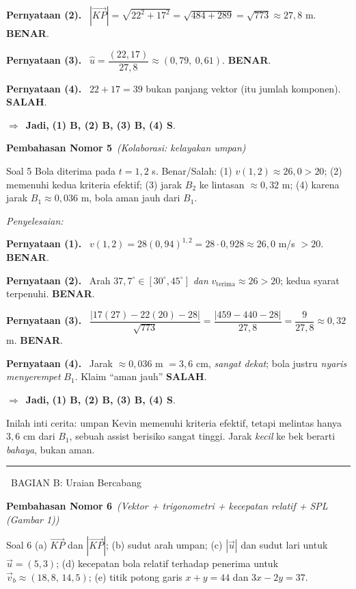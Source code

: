 \documentclass[11pt,a4paper]{article}
\newcommand{\jawab}{\par\smallskip\noindent\textit{\textcolor{oranye}{Penyelesaian:}}\par\smallskip}
\newcommand{\jadi}{\par\smallskip\noindent$\Rightarrow$\ \textbf{Jadi, }}
\newcommand{\benar}{\textbf{\textcolor{hijau}{BENAR}}}
\newcommand{\salah}{\textbf{\textcolor{merah}{SALAH}}}
\newcommand{\pernyataan}[1]{\par\smallskip\noindent\textbf{Pernyataan (#1).}\ }
\newcommand{\bagianjudul}[1]{\par\bigskip\noindent%
  {\large\bfseries\color{ungu}\rule[-2pt]{4pt}{16pt}\ #1}\par\smallskip}
\newcommand{\nomorjudul}[2]{\par\bigskip\noindent%
  {\large\bfseries\color{ungu}Pembahasan Nomor #1}\ {\normalfont\itshape\color{gray}(#2)}\par\nopagebreak\smallskip}
\begin{document}
\pernyataan{2} $|\vec{KP}|=\sqrt{22^2+17^2}=\sqrt{484+289}=\sqrt{773}\approx27{,}8$ m. \benar.

\pernyataan{3} $\hat{u}=\dfrac{(22,17)}{27{,}8}\approx(0{,}79,\ 0{,}61)$. \benar.

\pernyataan{4} $22+17=39$ bukan panjang vektor (itu jumlah komponen). \salah.

\jadi \textbf{(1) B, (2) B, (3) B, (4) S}.

\nomorjudul{5}{Kolaborasi: kelayakan umpan}
\begin{soalbox}{Soal 5}
Bola diterima pada $t=1{,}2$ s. Benar/Salah: (1) $v(1{,}2)\approx26{,}0>20$;
(2) memenuhi kedua kriteria efektif; (3) jarak $B_2$ ke lintasan $\approx0{,}32$ m;
(4) karena jarak $B_1\approx0{,}036$ m, bola aman jauh dari $B_1$.
\end{soalbox}

\jawab
\pernyataan{1} $v(1{,}2)=28(0{,}94)^{1{,}2}=28\cdot0{,}928\approx26{,}0$ m/s $>20$. \benar.

\pernyataan{2} Arah $37{,}7^\circ\in[30^\circ,45^\circ]$ \emph{dan} $v_{\text{terima}}\approx26>20$;
kedua syarat terpenuhi. \benar.

\pernyataan{3} $\dfrac{|17(27)-22(20)-28|}{\sqrt{773}}=\dfrac{|459-440-28|}{27{,}8}=\dfrac{9}{27{,}8}\approx0{,}32$ m. \benar.

\pernyataan{4} Jarak $\approx0{,}036$ m $=3{,}6$ cm, \emph{sangat dekat}; bola justru
\emph{nyaris menyerempet} $B_1$. Klaim ``aman jauh'' \salah.

\jadi \textbf{(1) B, (2) B, (3) B, (4) S}.

\begin{tips}
Inilah inti cerita: umpan Kevin memenuhi kriteria efektif, tetapi melintas hanya
$3{,}6$ cm dari $B_1$, sebuah assist berisiko sangat tinggi. Jarak \emph{kecil}
ke bek berarti \emph{bahaya}, bukan aman.
\end{tips}

\bagianjudul{BAGIAN B: Uraian Bercabang}

\nomorjudul{6}{Vektor + trigonometri + kecepatan relatif + SPL (Gambar 1)}
\begin{soalbox}{Soal 6}
(a) $\vec{KP}$ dan $|\vec{KP}|$; (b) sudut arah umpan; (c) $|\vec{u}|$ dan sudut
lari untuk $\vec{u}=(5,3)$; (d) kecepatan bola relatif terhadap penerima untuk
$\vec{v}_b\approx(18{,}8,\,14{,}5)$; (e) titik potong garis $x+y=44$ dan $3x-2y=37$.
\end{soalbox}
\end{document}
